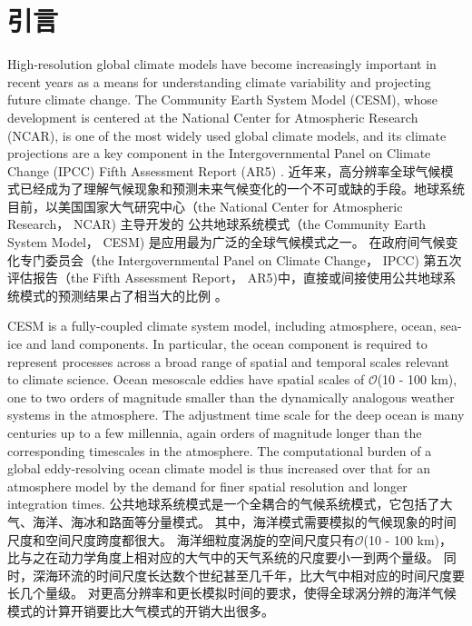 \chapter{引言}
\label{cha:intro}


High-resolution global climate models have become increasingly important
in recent years as a means for understanding climate variability
and projecting future climate change.  The Community Earth System
Model (CESM), whose development is centered at the National Center for
Atmospheric Research (NCAR), is one of the most widely used global
climate models, and its climate projections are a key component in the
Intergovernmental Panel on Climate Change (IPCC) Fifth Assessment
Report (AR5) \cite{stocker2013ipcc}.
近年来，高分辨率全球气候模式已经成为了理解气候现象和预测未来气候变化的一个不可或缺的手段。地球系统
目前，以美国国家大气研究中心（the National Center for Atmospheric Research， NCAR) 主导开发的
公共地球系统模式（the Community Earth System Model， CESM) 是应用最为广泛的全球气候模式之一。
在政府间气候变化专门委员会（the
Intergovernmental Panel on Climate Change， IPCC) 第五次评估报告（the Fifth Assessment
Report， AR5)中，直接或间接使用公共地球系统模式的预测结果占了相当大的比例 \cite{stocker2013ipcc}。
 

CESM is a fully-coupled climate system model, including atmosphere,
ocean, sea-ice and land components. In particular, the ocean component
is required to represent processes across a broad range of spatial and
temporal scales relevant to climate science. Ocean mesoscale eddies
have spatial scales of $\mathcal{O}$(10 - 100 km), one to two orders of magnitude
smaller than the dynamically analogous weather systems in the
atmosphere. The adjustment time scale for the deep ocean is many
centuries up to a few millennia, again orders of magnitude longer than
the corresponding timescales in the atmosphere. The computational
burden of a global eddy-resolving ocean climate model \cite{bryan2010frontal,mcclean2011prototype,graham2014importance} is
thus increased over that for an atmosphere model by the demand for
finer spatial resolution and longer integration times.
公共地球系统模式是一个全耦合的气候系统模式，它包括了大气、海洋、海冰和路面等分量模式。
其中，海洋模式需要模拟的气候现象的时间尺度和空间尺度跨度都很大。 
海洋细粒度涡旋的空间尺度只有$\mathcal{O}$(10 - 100 km)， 比与之在动力学角度上相对应的大气中的天气系统的尺度要小一到两个量级。
同时，深海环流的时间尺度长达数个世纪甚至几千年，比大气中相对应的时间尺度要长几个量级。
对更高分辨率和更长模拟时间的要求，使得全球涡分辨的海洋气候模式的计算开销要比大气模式的开销大出很多\cite{bryan2010frontal,mcclean2011prototype,graham2014importance}。


